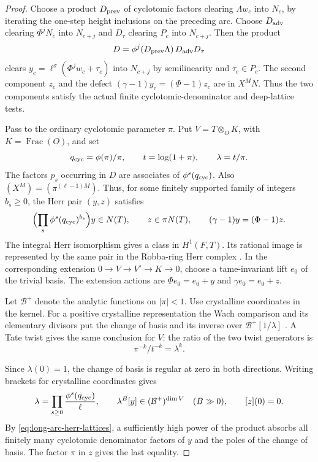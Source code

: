 \begin{proof}
Choose a product \(D_{\rm prev}\) of cyclotomic factors
clearing \(\Lambda w_c\) into \(N_c\), by iterating the
one-step height inclusions on the preceding arc. Choose
\(D_{\rm adv}\) clearing \(\Phi^j N_c\) into \(N_{c+j}\)
and \(D_\tau\) clearing \(P_c\) into \(N_{c+j}\).
Then the product
\[
            D=\phi^j(D_{\rm prev}\Lambda)\,D_{\rm adv}D_\tau
\]
clears \(y_c=\ell^\sigma(\Phi^j w_c+\tau_c)\) into \(N_{c+j}\)
by semilinearity and \(\tau_c\in P_c\).
The second component \(z_c\) and the defect
\((\gamma-1)y_c=(\Phi-1)z_c\) are in \(X^MN\).
Thus the two components satisfy the actual finite
cyclotomic-denominator and deep-lattice tests.

Pass to the ordinary cyclotomic parameter \(\pi\). Put
\(V=T\otimes_O K\), with \(K=\operatorname{Frac}(O)\), and set
\[
 q_{\rm cyc}=\phi(\pi)/\pi,\qquad t=\log(1+\pi),\qquad
 \lambda=t/\pi .
\]
The factors \(p_s\) occurring in \(D\) are associates of
\(\phi^s(q_{\rm cyc})\). Also \((X^M)=(\pi^{(\ell-1)M})\).
Thus, for some finitely supported family of integers \(b_s\ge0\),
the Herr pair \((y,z)\) satisfies
\begin{equation}\label{eq:long-arc-herr-lattices}
 \Bigl(\prod_s\phi^s(q_{\rm cyc})^{b_s}\Bigr)y\in N(T),\qquad
 z\in\pi N(T),\qquad (\gamma-1)y=(\Phi-1)z .
\end{equation}
The integral Herr isomorphism gives a class in \(H^1(F,T)\).
Its rational image is represented by the same pair in the Robba-ring
Herr complex \cite[Theorems 2.3 and 2.8]{liu-herr}.
In the corresponding extension \(0\to V\to V'\to K\to0\), choose
a tame-invariant lift \(e_0\) of the trivial basis. The extension
actions are \(\Phi e_0=e_0+y\) and \(\gamma e_0=e_0+z\).

Let \(\mathcal B^+\) denote the analytic functions on \(|\pi|<1\).
Use crystalline coordinates in the kernel. For a positive crystalline
representation the Wach comparison and its elementary divisors put the
change of basis and its inverse over \(\mathcal B^+[1/\lambda]\)
\cite[Propositions II.2.1 and III.2.1]{berger-wach}.
A Tate twist gives the same conclusion for \(V\): the ratio of
the two twist generators is
\[
 \pi^{-k}/t^{-k}=\lambda^k.
\]

Since \(\lambda(0)=1\), the change of basis is regular at zero
in both directions. Writing brackets for crystalline coordinates gives
\[
 \lambda=\prod_{s\ge0}\frac{\phi^s(q_{\rm cyc})}{\ell},
 \qquad \lambda^B[y]\in(\mathcal B^+)^{\dim V}\quad(B\gg 0),
 \qquad [z](0)=0 .
\]
By \eqref{eq:long-arc-herr-lattices}, a sufficiently high power of the product absorbs all finitely
many cyclotomic denominator factors of \(y\) and the poles of the
change of basis. The factor \(\pi\) in \(z\) gives the last equality.


\end{proof}
